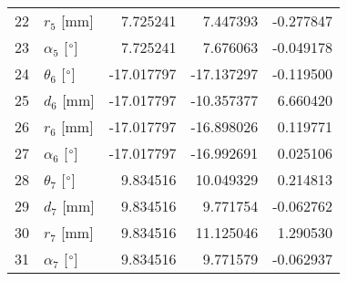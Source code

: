 \documentclass{standalone}%
\begin{document}
\begin{tabular}{llrrr}
22 &              $r_{5}$ [mm] &   7.725241 &   7.447393 &  -0.277847 \\
23 &  $\alpha_{5}$ [$\degree$] &   7.725241 &   7.676063 &  -0.049178 \\
24 &  $\theta_{6}$ [$\degree$] & -17.017797 & -17.137297 &  -0.119500 \\
25 &              $d_{6}$ [mm] & -17.017797 & -10.357377 &   6.660420 \\
26 &              $r_{6}$ [mm] & -17.017797 & -16.898026 &   0.119771 \\
27 &  $\alpha_{6}$ [$\degree$] & -17.017797 & -16.992691 &   0.025106 \\
28 &  $\theta_{7}$ [$\degree$] &   9.834516 &  10.049329 &   0.214813 \\
29 &              $d_{7}$ [mm] &   9.834516 &   9.771754 &  -0.062762 \\
30 &              $r_{7}$ [mm] &   9.834516 &  11.125046 &   1.290530 \\
31 &  $\alpha_{7}$ [$\degree$] &   9.834516 &   9.771579 &  -0.062937 \\
\bottomrule
\end{tabular}
%
\end{document}
